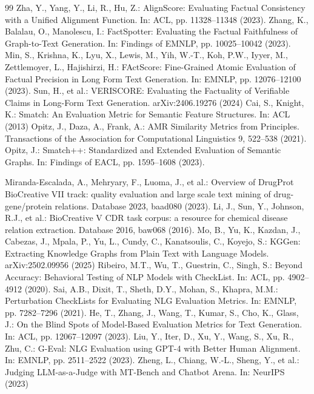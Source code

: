 \begin{thebibliography}{99}
 Zha, Y., Yang, Y., Li, R., Hu, Z.: AlignScore: Evaluating Factual Consistency with a Unified Alignment Function. In: ACL, pp. 11328--11348 (2023). 
 Zhang, K., Balalau, O., Manolescu, I.: FactSpotter: Evaluating the Factual Faithfulness of Graph-to-Text Generation. In: Findings of EMNLP, pp. 10025--10042 (2023). 
 Min, S., Krishna, K., Lyu, X., Lewis, M., Yih, W.-T., Koh, P.W., Iyyer, M., Zettlemoyer, L., Hajishirzi, H.: FActScore: Fine-Grained Atomic Evaluation of Factual Precision in Long Form Text Generation. In: EMNLP, pp. 12076--12100 (2023). 
 Sun, H., et al.: VERISCORE: Evaluating the Factuality of Verifiable Claims in Long-Form Text Generation. arXiv:2406.19276 (2024)
 Cai, S., Knight, K.: Smatch: An Evaluation Metric for Semantic Feature Structures. In: ACL (2013)
 Opitz, J., Daza, A., Frank, A.: AMR Similarity Metrics from Principles. Transactions of the Association for Computational Linguistics 9, 522--538 (2021). 
 Opitz, J.: Smatch++: Standardized and Extended Evaluation of Semantic Graphs. In: Findings of EACL, pp. 1595--1608 (2023). 

 Miranda-Escalada, A., Mehryary, F., Luoma, J., et al.: Overview of DrugProt BioCreative VII track: quality evaluation and large scale text mining of drug-gene/protein relations. Database 2023, baad080 (2023). 
 Li, J., Sun, Y., Johnson, R.J., et al.: BioCreative V CDR task corpus: a resource for chemical disease relation extraction. Database 2016, baw068 (2016). 
 Mo, B., Yu, K., Kazdan, J., Cabezas, J., Mpala, P., Yu, L., Cundy, C., Kanatsoulis, C., Koyejo, S.: KGGen: Extracting Knowledge Graphs from Plain Text with Language Models. arXiv:2502.09956 (2025)
 Ribeiro, M.T., Wu, T., Guestrin, C., Singh, S.: Beyond Accuracy: Behavioral Testing of NLP Models with CheckList. In: ACL, pp. 4902--4912 (2020). 
 Sai, A.B., Dixit, T., Sheth, D.Y., Mohan, S., Khapra, M.M.: Perturbation CheckLists for Evaluating NLG Evaluation Metrics. In: EMNLP, pp. 7282--7296 (2021). 
 He, T., Zhang, J., Wang, T., Kumar, S., Cho, K., Glass, J.: On the Blind Spots of Model-Based Evaluation Metrics for Text Generation. In: ACL, pp. 12067--12097 (2023). 
 Liu, Y., Iter, D., Xu, Y., Wang, S., Xu, R., Zhu, C.: G-Eval: NLG Evaluation using GPT-4 with Better Human Alignment. In: EMNLP, pp. 2511--2522 (2023). 
 Zheng, L., Chiang, W.-L., Sheng, Y., et al.: Judging LLM-as-a-Judge with MT-Bench and Chatbot Arena. In: NeurIPS (2023)
\end{thebibliography}
